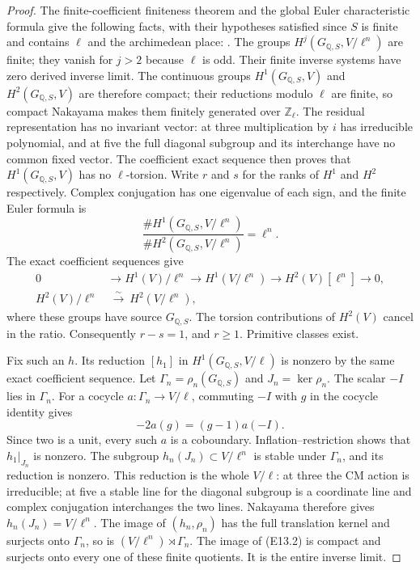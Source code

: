 \documentclass[11pt,oneside]{article}
\begin{document}
\begin{proof}
The finite-coefficient finiteness theorem and the global Euler
characteristic formula give the following facts, with their
hypotheses satisfied since $S$ is finite and contains $\ell$
and the archimedean place:
\cite[I.4.10(c), I.4.15, and I.5.1]{E_density_MilneADT}.
The groups $H^j(G_{\mathbb Q,S},V/\ell^n)$ are finite;
they vanish for $j>2$ because $\ell$ is odd.
Their finite inverse systems have zero derived inverse limit.
The continuous groups $H^1(G_{\mathbb Q,S},V)$ and
$H^2(G_{\mathbb Q,S},V)$ are therefore compact; their reductions
modulo $\ell$ are finite, so compact Nakayama makes them finitely
generated over $\mathbb Z_\ell$.
The residual representation has no invariant vector: at three
multiplication by $i$ has irreducible polynomial, and at five
the full diagonal subgroup and its interchange have no common
fixed vector.  The coefficient exact sequence then proves that
$H^1(G_{\mathbb Q,S},V)$ has no $\ell$-torsion.
Write $r$ and $s$ for the ranks of $H^1$ and $H^2$ respectively.
Complex conjugation has one eigenvalue of each sign, and the
finite Euler formula is
\[
 \frac{\#H^1(G_{\mathbb Q,S},V/\ell^n)}
      {\#H^2(G_{\mathbb Q,S},V/\ell^n)}=\ell^n.
\]
The exact coefficient sequences give
\[
\begin{split}
0&\longrightarrow H^1(V)/\ell^n
 \longrightarrow H^1(V/\ell^n)
 \longrightarrow H^2(V)[\ell^n]\longrightarrow0,\\
H^2(V)/\ell^n&\ \xrightarrow{\sim}\ H^2(V/\ell^n),
\end{split}
\]
where these groups have source $G_{\mathbb Q,S}$.
The torsion contributions of $H^2(V)$ cancel in the ratio.
Consequently $r-s=1$, and $r\ge1$.  Primitive classes exist.

Fix such an $h$.  Its reduction $[h_1]$ in
$H^1(G_{\mathbb Q,S},V/\ell)$ is nonzero by the same exact
coefficient sequence.  Let $\Gamma_n=\rho_n(G_{\mathbb Q,S})$
and $J_n=\ker\rho_n$.  The scalar $-I$ lies in $\Gamma_n$.
For a cocycle $a:\Gamma_n\to V/\ell$, commuting $-I$ with $g$
in the cocycle identity gives
\[
       -2a(g)=(g-1)a(-I).
\]
Since two is a unit, every such $a$ is a coboundary.
Inflation--restriction shows that $h_1|_{J_n}$ is nonzero.
The subgroup $h_n(J_n)\subset V/\ell^n$ is stable under
$\Gamma_n$, and its reduction is nonzero.  This reduction is
the whole $V/\ell$: at three the CM action is irreducible;
at five a stable line for the diagonal subgroup is a coordinate
line and complex conjugation interchanges the two lines.
Nakayama therefore gives $h_n(J_n)=V/\ell^n$.
The image of $(h_n,\rho_n)$ has the full translation kernel
and surjects onto $\Gamma_n$, so is
$(V/\ell^n)\rtimes\Gamma_n$.
The image of (E13.2) is compact and surjects onto every one
of these finite quotients.  It is the entire inverse limit.
\end{proof}
\end{document}
